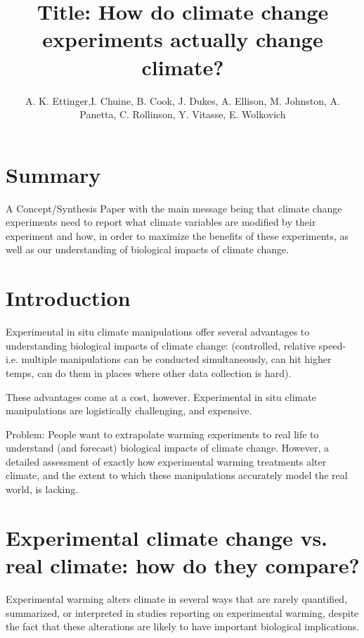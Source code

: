 \documentclass{article}
\begin{document}

\title{Title: How do climate change experiments actually change climate?} 
\author{A. K. Ettinger,I. Chuine, B. Cook, J. Dukes, A. Ellison, M. Johnston, A. Panetta, C. Rollinson, Y. Vitasse, E. Wolkovich}
\maketitle  %
\section {Summary}
A Concept/Synthesis Paper with the main message being that climate change experiments need to report what climate variables are modified by their experiment and how, in order to maximize the benefits of these experiments, as well as our understanding of biological impacts of climate change.
\section {Introduction}
Experimental in situ climate manipulations offer several advantages to understanding biological impacts of climate change: (controlled, relative speed- i.e. multiple manipulations can be conducted simultaneously, can hit higher temps, can do them in places where other data collection is hard). 

These advantages come at a cost, however. Experimental in situ climate manipulations are logistically challenging, and expensive. 

Problem:
People want to extrapolate warming experiments to real life to understand (and forecast) biological impacts of climate change. However, a detailed assessment of exactly how experimental warming treatments alter climate, and the extent to which these manipulations accurately model the real world, is lacking. 

\section {Experimental climate change vs. real climate: how do they compare?}
Experimental warming alters climate in several ways that are rarely quantified, summarized, or interpreted in studies reporting on experimental warming, despite the fact that these alterations are likely to have important biological implications.
\end{document}

